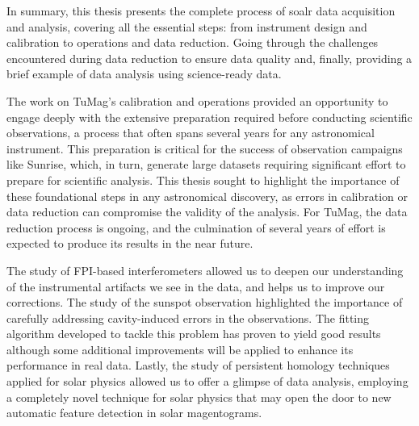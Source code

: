 In summary, this thesis presents the complete process of soalr data acquisition and analysis, covering all the essential steps: from instrument design and calibration to operations and data reduction. Going through the challenges encountered during data reduction to ensure data quality and, finally, providing a brief example of data analysis using science-ready data.

The work on TuMag's calibration and operations provided an opportunity to engage deeply with the extensive preparation required before conducting scientific observations, a process that often spans several years for any astronomical instrument. This preparation is critical for the success of observation campaigns like Sunrise, which, in turn, generate large datasets requiring significant effort to prepare for scientific analysis. This thesis sought to highlight the importance of these foundational steps in any astronomical discovery, as errors in calibration or data reduction can compromise the validity of the analysis. 
For TuMag, the data reduction process is ongoing, and the culmination of several years of effort is expected to produce its results in the near future.   

The study of FPI-based interferometers allowed us to deepen our understanding of the instrumental artifacts we see in the data, and helps us to improve our corrections. The study of the sunspot observation highlighted the importance of carefully addressing cavity-induced errors in the observations. The fitting algorithm developed to tackle this problem has proven to yield good results although some additional improvements will be applied to enhance its performance in real data. Lastly, the study of persistent homology techniques applied for solar physics allowed us to offer a glimpse of data analysis, employing a completely novel technique for solar physics that may open the door to new automatic feature detection in solar magentograms.